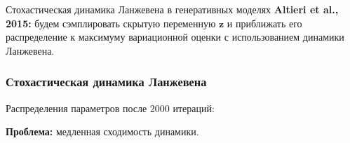 \documentclass[usenames,dvipsnames,10pt,pdf,utf8,russian,aspectratio=43]{beamer}
\begin{document}
\begin{frame}{Стохастическая динамика Ланжевена в генеративных моделях}
\textbf{Altieri et al., 2015:} будем сэмплировать скрытую переменную $\mathbf{z}$ и приближать его распределение к максимуму вариационной оценки с использованием динамики Ланжевена.
\begin{figure}[h]
\centering
{}
\end{figure}
\end{frame}

\begin{frame}
\frametitle{Стохастическая динамика Ланжевена}
Распределения параметров после 2000 итераций:
\begin{figure}[h]
\centering
{}
\end{figure}

\textbf{Проблема:} медленная сходимость динамики.

\end{frame}
\end{document}

